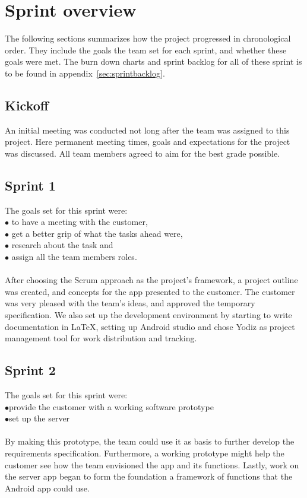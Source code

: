 \newpage
\section{Sprint overview}
\label{sec:sprintOverview}
The following sections summarizes how the project progressed in chronological order. They include the goals the team set for each sprint, and whether these goals were met. The burn down charts and sprint backlog for all of these sprint is to be found in appendix~\ref{sec:sprintbacklog}.

\subsection{Kickoff}
An initial meeting was conducted not long after the team was assigned to this project. Here permanent meeting times, goals and expectations for the project was discussed. All team members agreed to aim for the best grade possible.

\subsection{Sprint 1}
The goals set for this sprint were:\\
$\bullet$\hspace{0.25cm} to have a meeting with the customer,\\
$\bullet$\hspace{0.25cm} get a better grip of what the tasks ahead were,\\
$\bullet$\hspace{0.25cm} research about the task and\\
$\bullet$\hspace{0.25cm} assign all the team members roles.\\\\
After choosing the Scrum approach as the project's framework, a project outline was created, and concepts for the app presented to the customer. The customer was very pleased with the team's ideas, and approved the temporary specification. We also set up the development environment by starting to write documentation in \LaTeX, setting up Android studio and chose Yodiz as project management tool for work distribution and tracking.

\subsection{Sprint 2}
The goals set for this sprint were:\\
$\bullet$\hspace{0.25cm}provide the customer with a working software prototype\\
$\bullet$\hspace{0.25cm}set up the server\\\\
By making this prototype, the team could use it as basis to further develop the requirements specification. Furthermore, a working prototype might help the customer see how the team envisioned the app and its functions. Lastly, work on the server app began to form the foundation a framework of functions that the Android app could use. 

